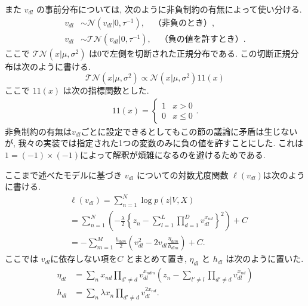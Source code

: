 \documentclass[a4paper,12ptc]{jsarticle} %
\newcommand{\normal}{\mathcal{N}}
\newcommand{\truncnorm}{\mathcal{TN}}
\newcommand{\C}{C}
\newcommand{\one}{1\!\!1}
\begin{document}
また $v_{dl}$ の事前分布については, 次のように非負制約の有無によって使い分ける.
\begin{align}
v_{dl} & \sim \normal(v_{dl} | 0,\tau^{-1}), \quad  \mbox{（非負のとき）} \label{eq_prior1}, \\
v_{dl} & \sim \truncnorm(v_{dl} | 0, \tau^{-1}), \quad  \mbox{（負の値を許すとき）.} \label{eq_prior2}
\end{align}
ここで $\truncnorm(x | \mu, \sigma^2)$ は0で左側を切断された正規分布である.
この切断正規分布は次のように書ける.
\begin{equation*}
   \truncnorm(x | \mu, \sigma^2) \propto    \normal(x | \mu, \sigma^2) \one(x) 
\end{equation*}
ここで $\one(x)$ は次の指標関数とした.
\begin{align*}
    \one(x)=\begin{cases} 1 & x>0\\
    0 &x \leq 0\end{cases}.
\end{align*}
非負制約の有無は$v_{dl}$ごとに設定できるとしてもこの節の議論に矛盾は生じないが, 我々の実装では指定された1つの変数のみに負の値を許すことにした. これは$1=(-1)\times(-1)$によって解釈が煩雑になるのを避けるためである.

ここまで述べたモデルに基づき $v_{dl}$ についての対数尤度関数 $\ell(v_{dl})$は次のように書ける.
\begin{align*}
& \ell(v_{dl}) =\sum_{n=1}^{N} \log p(z|V, X)\\
&= \sum_{n=1}^{N}\left(-\frac{\lambda}{2}\left\{ z_n -\sum_{l=1}^L\prod_{d=1}^D v_{dl}^{x_{nd}} \right\}^2\right)+ \C\\
&= -\sum_{m=1}^M\frac{h_{dlm}}{2}\left(v_{dl}^2-2v_{dl}\frac{\eta_{dlm}}{h_{dlm}}\right) +C.
\end{align*}
ここでは $v_{dl}$に依存しない項を$C$ とまとめて置き, $\eta_{dl}$ と $h_{dl}$ は次のように置いた.
\begin{align}
\eta_{dl} &= \sum_n x_{nd} \prod_{d' \neq d} v_{dl}^{x_{ndm}}\left( z_{n} - \sum_{l'\neq l} \prod_{d' \neq d} v_{dl}^{x_{nd}} \right) \label{eq_eta}\\
h_{dl} &= \sum_n \lambda x_{n} \prod_{d' \neq d} v_{dl}^{2x_{nd}}. \label{eq_h}
\end{align}
\end{document}
